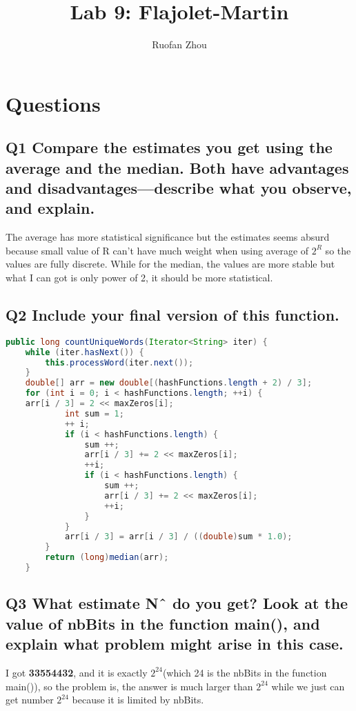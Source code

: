 \documentclass[11pt]{article} %
\title{Lab 9: Flajolet-Martin}
\author{Ruofan Zhou}
\begin{document}
\maketitle

\section{Questions}
\subsection{Q1 Compare the estimates you get using the average and the median. Both have advantages and disadvantages—describe what you observe, and explain.}

The average has more statistical significance but the estimates seems absurd because small value of R can't have much weight when using average of $2^{R}$ so the values are fully discrete. While for the median, the values are more stable but what I can got is only power of 2, it should be more statistical.

\subsection{Q2 Include your final version of this function.}

\begin{lstlisting}[language=JAVA]
public long countUniqueWords(Iterator<String> iter) {
    while (iter.hasNext()) {
        this.processWord(iter.next());
    }
    double[] arr = new double[(hashFunctions.length + 2) / 3];
    for (int i = 0; i < hashFunctions.length; ++i) {
	arr[i / 3] = 2 << maxZeros[i];
        	int sum = 1;
        	++ i;
        	if (i < hashFunctions.length) {
        		sum ++;
        		arr[i / 3] += 2 << maxZeros[i];
        		++i;
        		if (i < hashFunctions.length) {
        			sum ++;
        			arr[i / 3] += 2 << maxZeros[i];
        			++i;
        		}
        	}
        	arr[i / 3] = arr[i / 3] / ((double)sum * 1.0);
        }
        return (long)median(arr);
    }
\end{lstlisting}

\subsection{Q3 What estimate Nˆ do you get? Look at the value of nbBits in the function main(), and explain what problem might arise in this case.}

I got \textbf{33554432}, and it is exactly \textbf{$2^{24}$}(which 24 is the nbBits in the function main()), so the problem is, the answer is much larger than \textbf{$2^{24}$} while we just can get number \textbf{$2^{24}$} because it is limited by nbBits.
\end{document}
